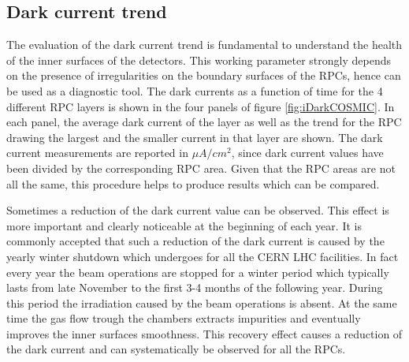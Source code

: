 \subsection{Dark current trend}
The evaluation of the dark current trend is fundamental to understand the health of the inner surfaces of the detectors.
This working parameter strongly depends on the presence of irregularities on the boundary surfaces of the RPCs, hence can be used as a diagnostic tool.
The dark currents as a function of time for the 4 different RPC layers is shown in the four panels of figure \ref{fig:iDarkCOSMIC}. 
In each panel, the average dark current of the layer as well as the trend for the RPC drawing the largest and the smaller current in that layer are shown.
The dark current measurements are reported in $\mu A/cm^2$, since dark current values have been divided by the corresponding RPC area.
Given that the RPC areas are not all the same, this procedure helps to produce results which can be compared.


Sometimes a reduction of the dark current value can be observed.
This effect is more important and clearly noticeable at the beginning of each year.
It is commonly accepted that such a reduction of the dark current is caused by the yearly winter shutdown which undergoes for all the CERN LHC facilities.
In fact every year the beam operations are stopped for a winter period which typically lasts from late November to the first 3-4 months of the following year.
During this period the irradiation caused by the beam operations is absent.
At the same time the gas flow trough the chambers extracts impurities and eventually improves the inner surfaces smoothness.
This recovery effect causes a reduction of the dark current and can systematically be observed for all the RPCs.


